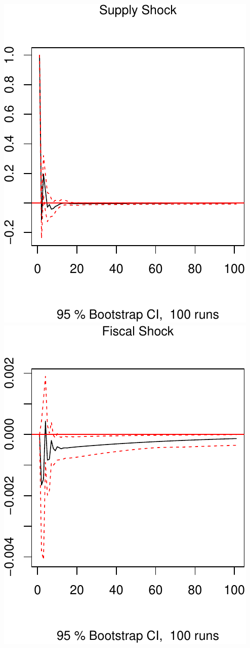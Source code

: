 \documentclass[11pt,preprint, authoryear]{elsarticle}
\numberwithin{equation}{section}
\numberwithin{figure}{section}
\numberwithin{table}{section}
\begin{document}
\includegraphics{TS_proj_files/figure-latex/unnamed-chunk-39-1.pdf}
\includegraphics{TS_proj_files/figure-latex/unnamed-chunk-39-2.pdf}
\end{document}
